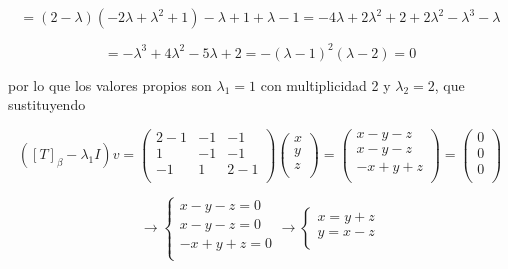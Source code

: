 \documentclass[12pt,a4paper]{article}
\begin{document}
\begin{enumerate}
    \begin{equation*}
        = (2-\lambda)(-2\lambda+\lambda^2+1)-\lambda+1 +\lambda-1 =-4\lambda+2\lambda^2+2 +2\lambda^2 -\lambda^3- \lambda 
    \end{equation*}
    
    \begin{equation*}
        =-\lambda^3+4\lambda^2-5\lambda +2 = -(\lambda-1)^2(\lambda-2) = 0
    \end{equation*}
    
    por lo que los valores propios son $\lambda_1 =1$ con multiplicidad 2 y $\lambda_2 = 2$, que sustituyendo
    
    \begin{equation*}
        ([T]_\beta - \lambda_1 I)v = \left(\begin{array}{lcc}
             2- 1 & -1 & -1 \\
             1 & -1 & -1 \\
             -1 & 1 & 2-1 \\
        \end{array}\right)\left(\begin{array}{lcc}
             x  \\
             y \\
             z \\
        \end{array}\right) = \left(\begin{array}{lcc}
             x-y-z \\
             x-y-z \\
             -x+y+z \\
        \end{array}\right) =\left(\begin{array}{lcc}
             0  \\
             0 \\
             0 \\
        \end{array} \right)
    \end{equation*}
    
    \begin{equation*}
        \longrightarrow  \left\{\begin{array}{cc}
             x-y-z = 0  \\
             x-y-z = 0 \\
             -x+y+z = 0 \\
        \end{array}\right. \longrightarrow
        \left\{\begin{array}{cc}
             x = y+z  \\
             y = x-z \\
        \end{array}\right.
    \end{equation*}
    

\end{enumerate}
\end{document}
